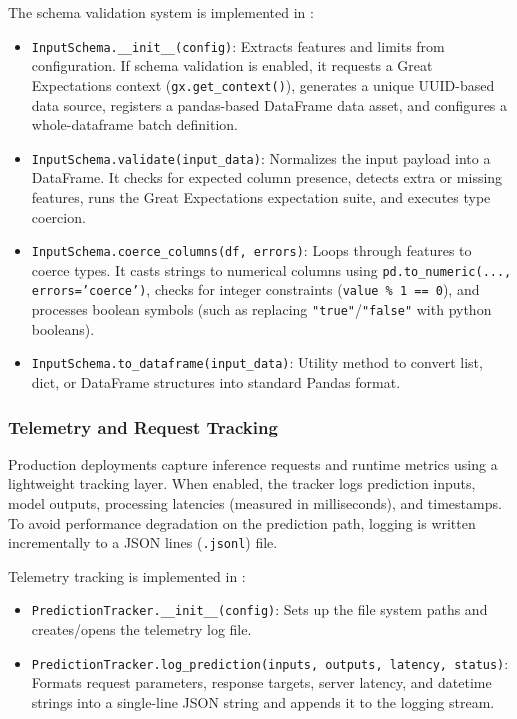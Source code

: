 \noindent The schema validation system is implemented in :
\begin{itemize}[leftmargin=*]
  \item \texttt{InputSchema.\_\_init\_\_(config)}: Extracts features and limits from configuration. If schema validation is enabled, it requests a Great Expectations context (\texttt{gx.get\_context()}), generates a unique UUID-based data source, registers a pandas-based DataFrame data asset, and configures a whole-dataframe batch definition.
  \item \texttt{InputSchema.validate(input\_data)}: Normalizes the input payload into a DataFrame. It checks for expected column presence, detects extra or missing features, runs the Great Expectations expectation suite, and executes type coercion.
  \item \texttt{InputSchema.coerce\_columns(df, errors)}: Loops through features to coerce types. It casts strings to numerical columns using \texttt{pd.to\_numeric(..., errors='coerce')}, checks for integer constraints (\texttt{value \% 1 == 0}), and processes boolean symbols (such as replacing \texttt{"true"}/\texttt{"false"} with python booleans).
  \item \texttt{InputSchema.to\_dataframe(input\_data)}: Utility method to convert list, dict, or DataFrame structures into standard Pandas format.
\end{itemize}

\subsubsection{Telemetry and Request Tracking}
\noindent Production deployments capture inference requests and runtime metrics using a lightweight tracking layer. When enabled, the tracker logs prediction inputs, model outputs, processing latencies (measured in milliseconds), and timestamps. To avoid performance degradation on the prediction path, logging is written incrementally to a JSON lines (\texttt{.jsonl}) file.

\noindent Telemetry tracking is implemented in :
\begin{itemize}[leftmargin=*]
  \item \texttt{PredictionTracker.\_\_init\_\_(config)}: Sets up the file system paths and creates/opens the telemetry log file.
  \item \texttt{PredictionTracker.log\_prediction(inputs, outputs, latency, status)}: Formats request parameters, response targets, server latency, and datetime strings into a single-line JSON string and appends it to the logging stream.
\end{itemize}

